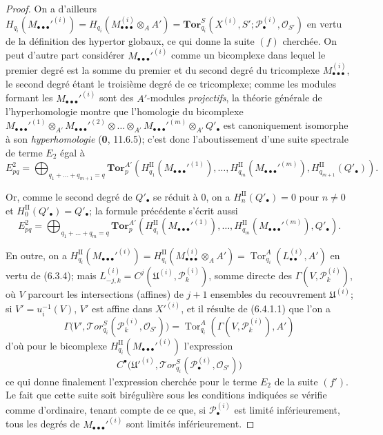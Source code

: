 \begin{proof}
On a d'ailleurs
$H_{q_i}(M_{\bullet\bullet\bullet}'^{(i)})
=H_{q_i}(M_{\bullet\bullet\bullet}^{(i)}\otimes_A A')
=\mathbf{Tor}_{q_i}^S
(X^{(i)},S';\mathscr P_\bullet^{(i)},\mathscr O_{S'})$
en vertu de la définition des hypertor globaux, ce qui donne la suite $(f)$
cherchée. On peut d'autre part considérer
$M_{\bullet\bullet\bullet}'^{(i)}$ comme un bicomplexe dans lequel le premier
degré est la somme du premier et du second degré du tricomplexe
$M_{\bullet\bullet\bullet}^{(i)}$, le second degré étant le troisième degré
de ce tricomplexe; comme les modules formant les
$M_{\bullet\bullet\bullet}'^{(i)}$ sont des $A'$-modules \emph{projectifs}, la théorie
générale de l'hyperhomologie montre que l'homologie du bicomplexe
$M_{\bullet\bullet\bullet}'^{(1)}\otimes_{A'}
M_{\bullet\bullet\bullet}'^{(2)}\otimes\ldots\otimes_{A'}
M_{\bullet\bullet\bullet}'^{(m)}\otimes_{A'} Q'_\bullet$
est canoniquement isomorphe à son \emph{hyperhomologie} (\textbf{0}, 11.6.5); c'est donc
l'aboutissement d'une suite spectrale de terme $E_2$ égal à
\[
  E_{pq}^2
  =\bigoplus_{q_1+\ldots+q_{m+1}=q}
  \mathbf{Tor}_p^{A'}
  (H_{q_1}^{\mathrm{II}}(M_{\bullet\bullet\bullet}'^{(1)}),\ldots,
   H_{q_m}^{\mathrm{II}}(M_{\bullet\bullet\bullet}'^{(m)}),
   H_{q_{m+1}}^{\mathrm{II}}(Q'_\bullet)).
\]

Or, comme le second degré de $Q'_\bullet$ se réduit à $0$, on a
$H_n^{\mathrm{II}}(Q'_\bullet)=0$ pour $n\ne0$ et
$H_0^{\mathrm{II}}(Q'_\bullet)=Q'_\bullet$; la formule précédente s'écrit
aussi
\[
  E_{pq}^2
  =\bigoplus_{q_1+\ldots+q_m=q}
  \mathbf{Tor}_p^{A'}
  (H_{q_1}^{\mathrm{II}}(M_{\bullet\bullet\bullet}'^{(1)}),\ldots,
   H_{q_m}^{\mathrm{II}}(M_{\bullet\bullet\bullet}'^{(m)}),Q'_\bullet).
\]

En outre, on a
$H_{q_i}^{\mathrm{II}}(M_{\bullet\bullet\bullet}'^{(i)})
=H_{q_i}^{\mathrm{II}}(M_{\bullet\bullet\bullet}^{(i)}\otimes_A A')
=\operatorname{Tor}_{q_i}^A(L_{\bullet\bullet}^{(i)},A')$
en vertu de (6.3.4); mais
$L_{-j,k}^{(i)}=C^j(\mathfrak U^{(i)},\mathscr P_k^{(i)})$, somme directe des
$\Gamma(V,\mathscr P_k^{(i)})$, où $V$ parcourt les intersections (affines) de
$j+1$ ensembles du recouvrement $\mathfrak U^{(i)}$; si
$V'=u_i^{-1}(V)$, $V'$ est affine dans $X'^{(i)}$, et il résulte de (6.4.1.1)
que l'on a
\[
  \Gamma\bigl(V',\mathscr{T}\!or_{q_i}^S
  (\mathscr P_k^{(i)},\mathscr O_{S'})\bigr)
  =\operatorname{Tor}_{q_i}^A(\Gamma(V,\mathscr P_k^{(i)}),A')
\]
d'où pour le bicomplexe
$H_{q_i}^{\mathrm{II}}(M_{\bullet\bullet\bullet}'^{(i)})$ l'expression
\[
  C^\bullet\bigl(\mathfrak U'^{(i)},
  \mathscr{T}\!or_{q_i}^S(\mathscr P_\bullet^{(i)},\mathscr O_{S'})\bigr)
\]
ce qui donne finalement l'expression cherchée pour le terme $E_2$ de la
suite $(f')$. Le fait que cette suite soit birégulière sous les conditions
indiquées se vérifie comme d'ordinaire, tenant compte de ce que, si
$\mathscr P_\bullet^{(i)}$ est limité inférieurement, tous les degrés de
$M_{\bullet\bullet\bullet}'^{(i)}$ sont limités inférieurement.
\end{proof}

